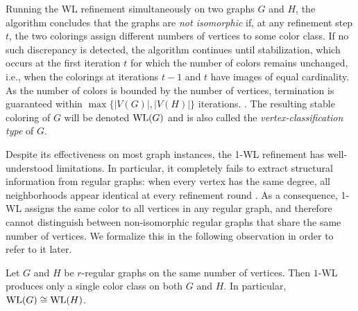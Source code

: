 Running the WL refinement simultaneously on two graphs $G$ and $H$, the algorithm concludes that the graphs are \emph{not isomorphic} if, at any refinement step $t$, the two colorings assign different numbers of vertices to some color class. 
If no such discrepancy is detected, the algorithm continues until stabilization, which occurs at the first iteration $t$ for which the number of colors remains unchanged, i.e., when the colorings at iterations $t-1$ and $t$ have images of equal cardinality. As the number of colors is bounded by the number of vertices, termination is guaranteed within $\max\{|V(G)|,|V(H)|\}$ iterations.
. The resulting stable coloring of $G$ will be denoted $\mathrm{WL}(G)$ and is also called the \emph{vertex-classification type} of $G$.

Despite its effectiveness on most graph instances, the 1-WL refinement has well-understood
limitations. In particular, it completely fails to extract structural information from regular
graphs: when every vertex has the same degree, all neighborhoods appear identical at every
refinement round \cite{WeisfeilerLehmanMethod,LowerBoundGraphIdentification}. As a consequence, 1-WL assigns the same color to all vertices in any
regular graph, and therefore cannot distinguish between non-isomorphic regular graphs that
share the same number of vertices. We formalize this in the following observation in order to refer to it later.


\begin{observation}
\label{obs:WL-regular-undistinguished}
Let $G$ and $H$ be $r$-regular graphs on the same number of vertices.
Then $1$-WL produces only a single color class on both $G$ and $H$.
In particular, $\mathrm{WL}(G) \cong \mathrm{WL}(H)$.
\end{observation}




